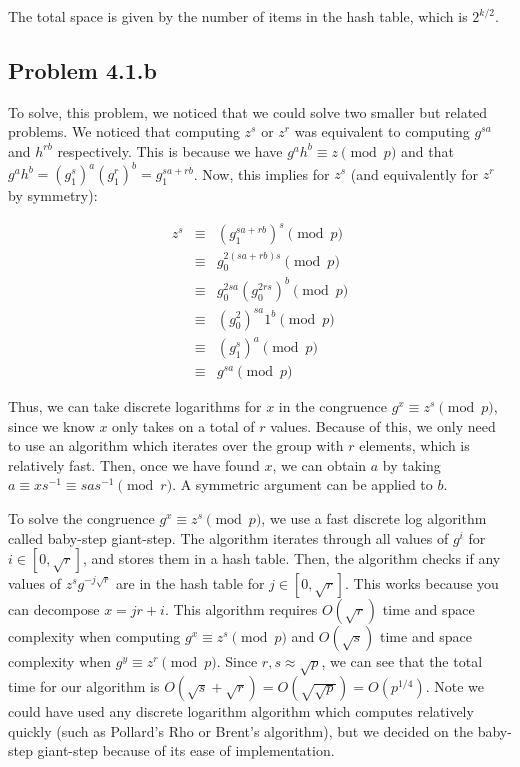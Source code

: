 \documentclass[psamsfonts]{amsart}
\begin{document}
The total space is given by the number of items in the hash table, which is $2^{k/2}$.

\subsection{Problem 4.1.b}

To solve, this problem, we noticed that we could solve two smaller but related problems. We noticed that computing $z^s$ or $z^r$ was equivalent to computing $g^{sa}$ and $h^{rb}$ respectively. This is because we have $g^a h^b \equiv z \pmod{p}$ and that $g^a h^b = (g_1^{s})^a (g_1^r)^b = g_1^{sa + rb}$. Now, this implies for $z^s$ (and equivalently for $z^r$ by symmetry):

\begin{eqnarray}
  z^s &\equiv& (g_1^{sa+rb})^s \pmod{p} \\
      &\equiv& g_0^{2(sa + rb)s} \pmod{p} \\
      &\equiv& g_0^{2sa} (g_0^{2rs})^b \pmod{p} \\
      &\equiv& (g_0^{2})^{sa} 1^b \pmod{p} \\
      &\equiv& (g_1^{s})^a \pmod{p} \\
      &\equiv& g^{sa} \pmod{p}
\end{eqnarray}

Thus, we can take discrete logarithms for $x$ in the congruence $g^{x} \equiv z^s \pmod{p}$, since we know $x$ only takes on a total of $r$ values. Because of this, we only need to use an algorithm which iterates over the group with $r$ elements, which is relatively fast. Then, once we have found $x$, we can obtain $a$ by taking $a \equiv x s^{-1} \equiv s a s^{-1} \pmod{r}$. A symmetric argument can be applied to $b$.

To solve the congruence $g^x \equiv z^s \pmod{p}$, we use a fast discrete log algorithm called baby-step giant-step. The algorithm iterates through all values of $g^{i}$ for $i \in [0, \sqrt{r}]$, and stores them in a hash table. Then, the algorithm checks if any values of $z^s g^{-j \sqrt{r}}$ are in the hash table for $j \in [0, \sqrt{r}]$. This works because you can decompose $x = jr + i$. This algorithm requires $O(\sqrt{r})$ time and space complexity when computing $g^x \equiv z^s \pmod{p}$ and $O(\sqrt{s})$ time and space complexity when $g^y \equiv z^r \pmod{p}$. Since $r,s \approx \sqrt{p}$, we can see that the total time for our algorithm is $O(\sqrt{s} + \sqrt{r}) = O(\sqrt{\sqrt{p}}) = O(p^{1/4})$. Note we could have used any discrete logarithm algorithm which computes relatively quickly (such as Pollard's Rho or Brent's algorithm), but we decided on the baby-step giant-step because of its ease of implementation.
\end{document}
